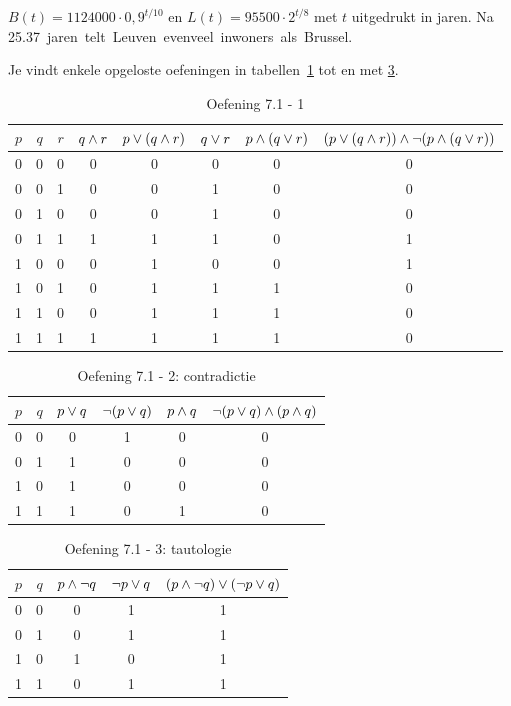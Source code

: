 \begin{Oplossing}{6.12}
$B(t)=\num{1124000}\cdot 0,9^{t/10}$ en $L(t)=\num{95500}\cdot 2^{t/8}$ met $t$ uitgedrukt in jaren. Na \SI{25,37} jaren telt Leuven evenveel inwoners als Brussel.
\end{Oplossing}
\begin{Oplossing}{7.1}
Je vindt enkele opgeloste oefeningen in tabellen~\ref{tab:logica1} tot en met \ref{tab:logica3}.
\begin{table}[htbp]\footnotesize
\centering
\caption{Oefening 7.1 - 1}
\begin{tabular}{cccccccc}
\toprule
$p$ & $q$ & $r$ & $q\wedge r$ & $p\vee (q\wedge r)$ & $q\vee r$ & $p\wedge (q\vee r)$ & $(p\vee (q\wedge r))\wedge \neg(p\wedge (q\vee r))$ \\
\midrule
0 & 0 & 0 & 0 & 0 & 0 & 0 & 0 \\
0 & 0 & 1 & 0 & 0 & 1 & 0 & 0 \\
0 & 1 & 0 & 0 & 0 & 1 & 0 & 0 \\
0 & 1 & 1 & 1 & 1 & 1 & 0 & 1 \\
1 & 0 & 0 & 0 & 1 & 0 & 0 & 1 \\
1 & 0 & 1 & 0 & 1 & 1 & 1 & 0 \\
1 & 1 & 0 & 0 & 1 & 1 & 1 & 0 \\
1 & 1 & 1 & 1 & 1 & 1 & 1 & 0 \\
\bottomrule
\end{tabular}
\label{tab:logica1}
\end{table}

\begin{table}[htbp]\footnotesize
\centering
\caption{Oefening 7.1 - 2: contradictie}
\begin{tabular}{cccccc}
\toprule
$p$ & $q$ & $p\vee q$ & $\neg(p\vee q)$ & $p\wedge q$ & $\neg(p\vee q)\wedge(p\wedge q)$ \\
\midrule
0 & 0 & 0 & 1 & 0 & 0 \\
0 & 1 & 1 & 0 & 0 & 0 \\
1 & 0 & 1 & 0 & 0 & 0 \\
1 & 1 & 1 & 0 & 1 & 0 \\
\bottomrule
\end{tabular}
\label{tab:logica2}
\end{table}

\begin{table}[htbp]\footnotesize
\centering
\caption{Oefening 7.1 - 3: tautologie}
\begin{tabular}{ccccc}
\toprule
$p$ & $q$ & $p\wedge \neg q$ & $\neg p \vee q$ & $(p\wedge \neg q)\vee (\neg p \vee q)$ \\
\midrule
0 & 0 & 0 & 1 & 1 \\
0 & 1 & 0 & 1 & 1 \\
1 & 0 & 1 & 0 & 1 \\
1 & 1 & 0 & 1 & 1 \\
\bottomrule
\end{tabular}
\label{tab:logica3}
\end{table}
\end{Oplossing}
